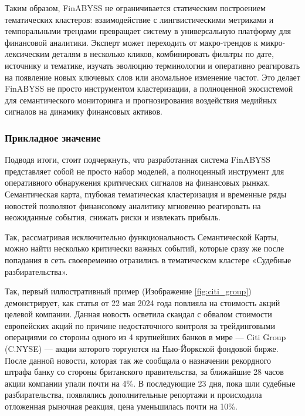 Таким образом, FinABYSS не ограничивается статическим построением тематических кластеров:
взаимодействие с лингвистическими метриками и темпоральными трендами превращает систему
в универсальную платформу для финансовой аналитики. Эксперт может переходить от макро-трендов
к микро-лексическим деталям в несколько кликов, комбинировать фильтры по дате, источнику и тематике,
изучать эволюцию терминологии и оперативно реагировать на появление новых ключевых слов или аномальное
изменение частот. Это делает FinABYSS не просто инструментом кластеризации, а полноценной экосистемой
для семантического мониторинга и прогнозирования воздействия медийных сигналов на динамику финансовых
активов.

\subsubsection{Прикладное значение}
\label{sec:practical_importance}

Подводя итоги, стоит подчеркнуть, что разработанная система FinABYSS представляет собой не просто набор моделей,
а полноценный инструмент для оперативного обнаружения критических сигналов на финансовых рынках. Семантическая
карта, глубокая тематическая кластеризация и временные ряды новостей позволяют финансовому аналитику мгновенно
реагировать на неожиданные события, снижать риски и извлекать прибыль.

Так, рассматривая исключительно функциональность Семантической Карты, можно найти несколько критически важных
событий, которые сразу же после попадания в сеть своевременно отразились в тематическом кластере «Судебные
разбирательства».

Так, первый иллюстративный пример (Изображение \ref{fig:citi_group}) демонстрирует, как статья от 22 мая 2024 года
повлияла на стоимость акций целевой компании. Данная новость осветила скандал с обвалом стоимости европейских акций
по причине недостаточного контроля за трейдинговыми операциями со стороны одного из 4 крупнейших банков в мире ---
Citi Group (C.NYSE) — акции которого торгуются на Нью-Йоркской фондовой бирже. После данной новости, которая так же
сообщала о назначении рекордного штрафа банку со стороны британского правительства, за ближайшие 28 часов акции компании
упали почти на 4\%. В последующие 23 дня, пока шли судебные разбирательства, появлялись дополнительные репортажи
и происходила отложенная рыночная реакция, цена уменьшилась почти на 10\%.

